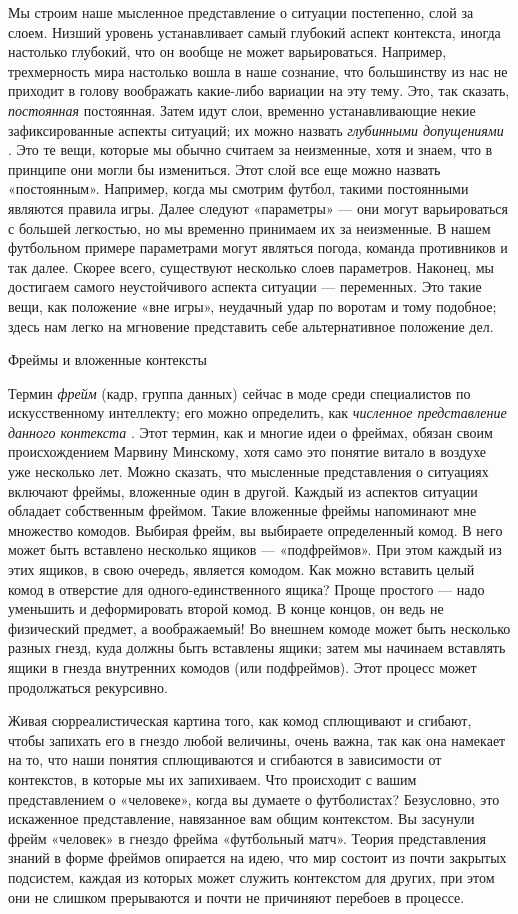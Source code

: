 \documentclass[../main.tex]{subfiles}
\begin{document}
Мы строим наше мысленное представление о ситуации постепенно, слой за слоем. Низший уровень устанавливает самый глубокий аспект контекста, иногда настолько глубокий, что он вообще не может варьироваться. Например, трехмерность мира настолько вошла в наше сознание, что большинству из нас не приходит в голову воображать какие-либо вариации на эту тему. Это, так сказать, \emph{постоянная} постоянная. Затем идут слои, временно устанавливающие некие зафиксированные аспекты ситуаций; их можно назвать \emph{глубинными допущениями} . Это те вещи, которые мы обычно считаем за неизменные, хотя и знаем, что в принципе они могли бы измениться. Этот слой все еще можно назвать «постоянным». Например, когда мы смотрим футбол, такими постоянными являются правила игры. Далее следуют «параметры» --- они могут варьироваться с большей легкостью, но мы временно принимаем их за неизменные. В нашем футбольном примере параметрами могут являться погода, команда противников и так далее. Скорее всего, существуют несколько слоев параметров. Наконец, мы достигаем самого неустойчивого аспекта ситуации --- переменных. Это такие вещи, как положение «вне игры», неудачный удар по воротам и тому подобное; здесь нам легко на мгновение представить себе альтернативное положение дел.

Фреймы и вложенные контексты

Термин \emph{фрейм} (кадр, группа данных) сейчас в моде среди специалистов по искусственному интеллекту; его можно определить, как \emph{численное представление данного контекста} . Этот термин, как и многие идеи о фреймах, обязан своим происхождением Марвину Минскому, хотя само это понятие витало в воздухе уже несколько лет. Можно сказать, что мысленные представления о ситуациях включают фреймы, вложенные один в другой. Каждый из аспектов ситуации обладает собственным фреймом. Такие вложенные фреймы напоминают мне множество комодов. Выбирая фрейм, вы выбираете определенный комод. В него может быть вставлено несколько ящиков --- «подфреймов». При этом каждый из этих ящиков, в свою очередь, является комодом. Как можно вставить целый комод в отверстие для одного-единственного ящика? Проще простого --- надо уменьшить и деформировать второй комод. В конце концов, он ведь не физический предмет, а воображаемый! Во внешнем комоде может быть несколько разных гнезд, куда должны быть вставлены ящики; затем мы начинаем вставлять ящики в гнезда внутренних комодов (или подфреймов). Этот процесс может продолжаться рекурсивно.

Живая сюрреалистическая картина того, как комод сплющивают и сгибают, чтобы запихать его в гнездо любой величины, очень важна, так как она намекает на то, что наши понятия сплющиваются и сгибаются в зависимости от контекстов, в которые мы их запихиваем. Что происходит с вашим представлением о «человеке», когда вы думаете о футболистах? Безусловно, это искаженное представление, навязанное вам общим контекстом. Вы засунули фрейм «человек» в гнездо фрейма «футбольный матч». Теория представления знаний в форме фреймов опирается на идею, что мир состоит из почти закрытых подсистем, каждая из которых может служить контекстом для других, при этом они не слишком прерываются и почти не причиняют перебоев в процессе.
\end{document}

